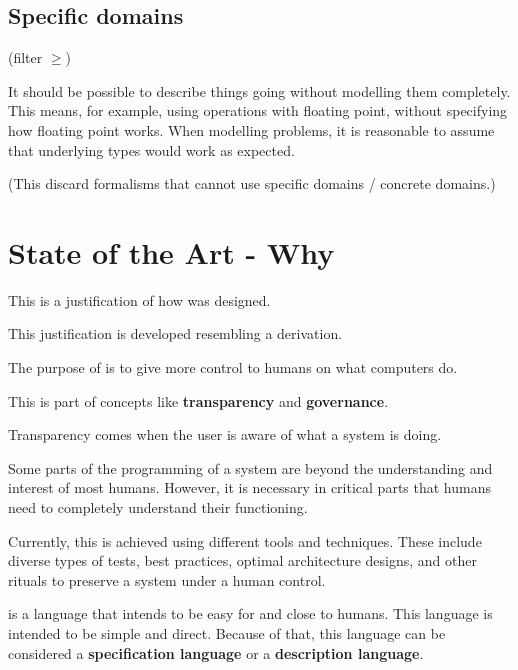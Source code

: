 \subsection{Specific domains}

(filter $\geq $)

It should be possible to describe things going without modelling them completely.
This means, for example, using operations with floating point, without specifying how floating point works.
When modelling problems, it is reasonable to assume that underlying types would work as expected.

(This discard formalisms that cannot use specific domains / concrete domains.)


\section{State of the Art - Why \Soda}

This is a justification of how \Soda was designed.

This justification is developed resembling a derivation.

The purpose of \Soda is to give more control to humans on what computers do.

This is part of concepts like \textbf{transparency} and \textbf{governance}.

Transparency comes when the user is aware of what a system is doing.

Some parts of the programming of a system are beyond the understanding and interest of most humans.
However, it is necessary in critical parts that humans need to completely understand their functioning.

Currently, this is achieved using different tools and techniques.
These include diverse types of tests, best practices, optimal architecture designs, and other rituals to preserve a system under a human control.

\Soda is a language that intends to be easy for and close to humans.
This language is intended to be simple and direct.
Because of that, this language can be considered a \textbf{specification language} or a \textbf{description language}.

